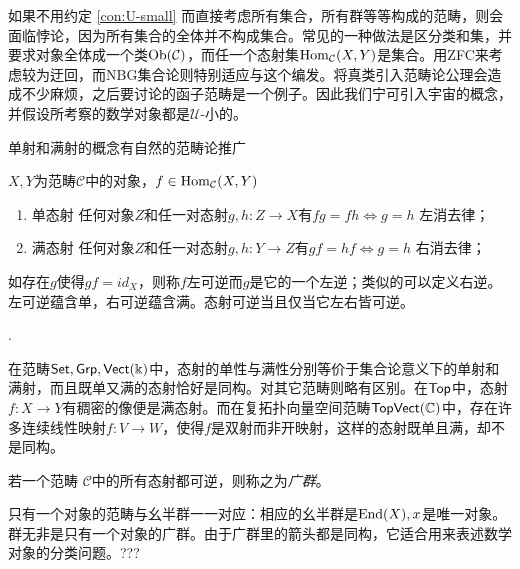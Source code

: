 \begin{Rmk}如果不用约定 \ref{con:U-small} 而直接考虑所有集合，所有群等等构成的范畴，则会面临悖论，因为所有集合的全体并不构成集合。常见的一种做法是区分类和集，并要求对象全体成一个类$\operatorname{Ob}({\mathcal{C}})$，而任一个态射集$\operatorname{Hom}_{\mathcal{C}}(X,Y)$是集合。用ZFC来考虑较为迂回，而NBG集合论则特别适应与这个编发。将真类引入范畴论公理会造成不少麻烦，之后要讨论的函子范畴是一个例子。因此我们宁可引入宇宙的概念，并假设所考察的数学对象都是$\mathcal{U}$-小的。
\end{Rmk}

    单射和满射的概念有自然的范畴论推广

\begin{Def}$X,Y$为范畴$\mathcal{C}$中的对象，$f\in \operatorname{Hom}_{\mathcal{C}}(X,Y)$
    \begin{enumerate}
        \item 单态射 任何对象$Z$和任一对态射$g,h:Z\rightarrow X$有$fg=fh\Leftrightarrow g=h$ 左消去律；
        \item 满态射 任何对象$Z$和任一对态射$g,h:Y\rightarrow Z$有$gf=hf\Leftrightarrow g=h$ 右消去律；
    \end{enumerate}
    如存在$g$使得$gf=id_X$，则称$f$左可逆而$g$是它的一个左逆；类似的可以定义右逆。左可逆蕴含单，右可逆蕴含满。态射可逆当且仅当它左右皆可逆。
\end{Def}

\begin{Exap}[常用范畴中的单性与满性].

    在范畴$\mathsf{Set}, \mathsf{Grp}, \mathsf{Vect}(\Bbbk)$中，态射的单性与满性分别等价于集合论意义下的单射和满射，而且既单又满的态射恰好是同构。对其它范畴则略有区别。在$\mathsf{Top}$中，态射$f:X\rightarrow Y$有稠密的像便是满态射。而在复拓扑向量空间范畴$\mathsf{TopVect}(\mathbb{C})$中，存在许多连续线性映射$f:V\rightarrow W$，使得$f$是双射而非开映射，这样的态射既单且满，却不是同构。
\end{Exap}

\begin{Def}[广群]
    若一个范畴 $\mathcal{C}$中的所有态射都可逆，则称之为\emph{广群}。
\end{Def}

    只有一个对象的范畴与幺半群一一对应：相应的幺半群是$\operatorname{End}(X),x$是唯一对象。群无非是只有一个对象的广群。由于广群里的箭头都是同构，它适合用来表述数学对象的分类问题。???

